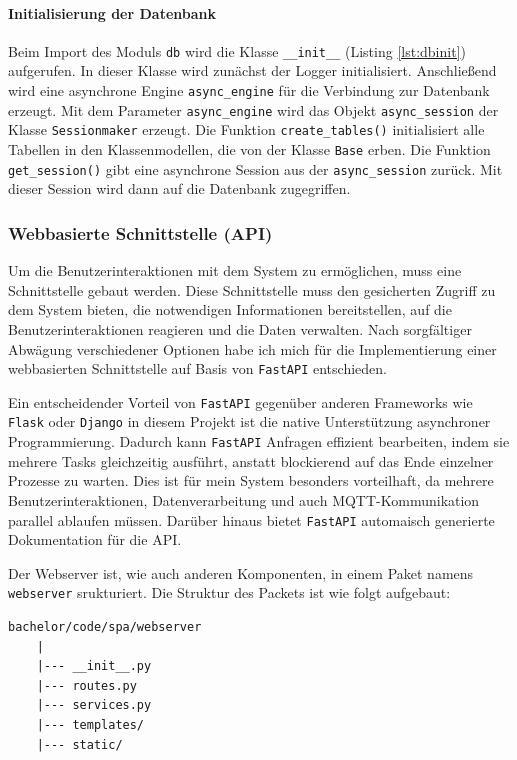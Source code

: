\documentclass[12pt, letterpaper]{article}
\begin{document}
  \paragraph{Initialisierung der Datenbank}
  \par \textbf{}
  \par Beim Import des Moduls \texttt{db} wird die Klasse \texttt{\_\_init\_\_} (Listing \ref{lst:dbinit}) aufgerufen. In dieser Klasse wird zunächst der Logger initialisiert. Anschließend wird eine asynchrone Engine \texttt{async\_engine} für die Verbindung zur Datenbank erzeugt. Mit dem Parameter \texttt{async\_engine} wird das Objekt \texttt{async\_session} der Klasse \texttt{Sessionmaker} erzeugt. Die Funktion \texttt{create\_tables()} initialisiert alle Tabellen in den Klassenmodellen, die von der Klasse \texttt{Base} erben. Die Funktion \texttt{get\_session()} gibt eine asynchrone Session aus der \texttt{async\_session} zurück. Mit dieser Session wird dann auf die Datenbank zugegriffen.
  \subsubsection{Webbasierte Schnittstelle (API)} 
  \par Um die Benutzerinteraktionen mit dem System zu ermöglichen, muss eine Schnittstelle gebaut werden. Diese Schnittstelle muss den gesicherten Zugriff zu dem System bieten, die notwendigen Informationen bereitstellen, auf die Benutzerinteraktionen reagieren und die Daten verwalten. Nach sorgfältiger Abwägung verschiedener Optionen habe ich mich für die Implementierung einer webbasierten Schnittstelle auf Basis von \texttt{FastAPI} entschieden.
  \par Ein entscheidender Vorteil von \texttt{FastAPI} gegenüber anderen Frameworks wie \texttt{Flask} oder \texttt{Django} in diesem Projekt ist die native Unterstützung asynchroner Programmierung. Dadurch kann \texttt{FastAPI} Anfragen effizient bearbeiten, indem sie mehrere Tasks gleichzeitig ausführt, anstatt blockierend auf das Ende einzelner Prozesse zu warten. Dies ist für mein System besonders vorteilhaft, da mehrere Benutzerinteraktionen, Datenverarbeitung und auch MQTT-Kommunikation parallel ablaufen müssen. Darüber hinaus bietet \texttt{FastAPI} automaisch generierte Dokumentation für die API.
  \par Der Webserver ist, wie auch anderen Komponenten, in einem Paket namens \texttt{webserver} srukturiert. Die Struktur des Packets ist wie folgt aufgebaut:
  \begin{Verbatim}[frame=single]
    bachelor/code/spa/webserver
    |
    |--- __init__.py
    |--- routes.py
    |--- services.py
    |--- templates/
    |--- static/
  \end{Verbatim}
  
\end{document}
